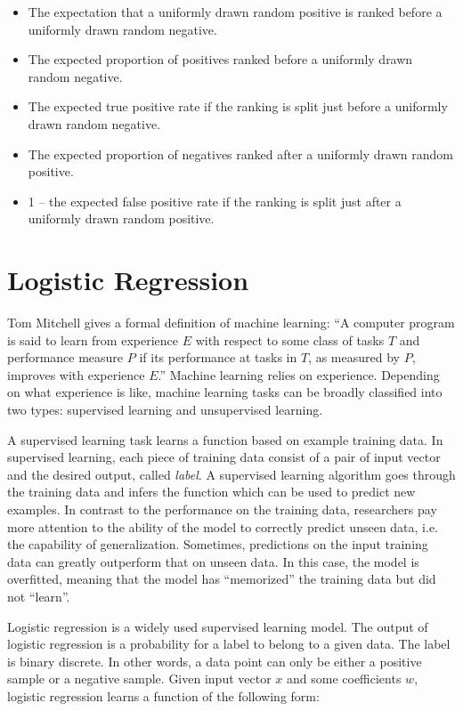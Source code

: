         \begin{itemize}
            \item The expectation that a uniformly drawn random positive is ranked before a uniformly drawn random negative.
            \item The expected proportion of positives ranked before a uniformly drawn random negative.
            \item The expected true positive rate if the ranking is split just before a uniformly drawn random negative.
            \item The expected proportion of negatives ranked after a uniformly drawn random positive.
            \item 1 – the expected false positive rate if the ranking is split just after a uniformly drawn random positive.
        \end{itemize}


\section{Logistic Regression}

    Tom Mitchell gives a formal definition of machine learning:
    ``A computer program is said to learn from experience $E$ with respect to some class of tasks $T$
    and performance measure $P$ if its performance at tasks in $T$, as measured by $P$, improves with experience $E$.''
    \cite{Mitchell1997}
    Machine learning relies on experience.
    Depending on what experience is like, machine learning tasks can be broadly classified into two types:
    supervised learning and unsupervised learning.

    A supervised learning task learns a function based on example training data.
    In supervised learning, each piece of training data consist of a pair of input vector
    and the desired output, called \emph{label}.
    A supervised learning algorithm goes through the training data and infers the function
    which can be used to predict new examples.
    In contrast to the performance on the training data,
    researchers pay more attention to the ability of the model to correctly predict unseen data,
    i.e. the capability of generalization.
    Sometimes, predictions on the input training data can greatly outperform that on unseen data.
    In this case, the model is overfitted, meaning that the model has ``memorized'' the training data
    but did not ``learn''.

    Logistic regression is a widely used supervised learning model.
    The output of logistic regression is a probability for a label to belong to a given data.
    The label is binary discrete.
    In other words, a data point can only be either a positive sample or a negative sample.
    Given input vector $x$ and some coefficients $w$,
    logistic regression learns a function of the following form:

